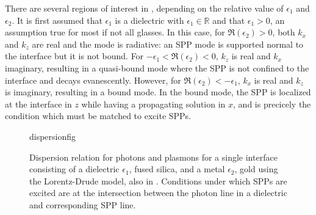 There are several regions of interest in ,
depending on the relative value of $\epsilon_1$ and $\epsilon_2$.  It is
first assumed that $\epsilon_1$ is a dielectric with
$\epsilon_1\in\mathbb{R}$ and that $\epsilon_1 > 0$, an assumption true for
most if not all glasses.  In this case, for $\Re(\epsilon_2)>0$, both $k_x$
and $k_z$ are real and the mode is radiative: an SPP mode is supported
normal to the interface but it is not bound.  For
$-\epsilon_1<\Re(\epsilon_2)<0$, $k_z$ is real and $k_x$ imaginary,
resulting in a quasi-bound mode where the SPP is not confined to the
interface and decays evanescently.  However, for
$\Re(\epsilon_2)<-\epsilon_1$, $k_x$ is real and $k_z$ is imaginary,
resulting in a bound mode.  In the bound mode, the SPP is localized at the
interface in $z$ while having a propagating solution in $x$, and is
precicely the condition which must be matched to excite SPPs.
\begin{figure}[ht]
\centering
{dispersionfig}
\caption{Dispersion relation for photons and plasmons for a single interface consisting of a dielectric $\epsilon_1$, fused silica, and a metal $\epsilon_2$, gold using the Lorentz-Drude model, also in . Conditions under which SPPs are excited are at the intersection between the photon line in a dielectric and corresponding SPP line.}
\label{fig:dispersionrelation}
\end{figure}
